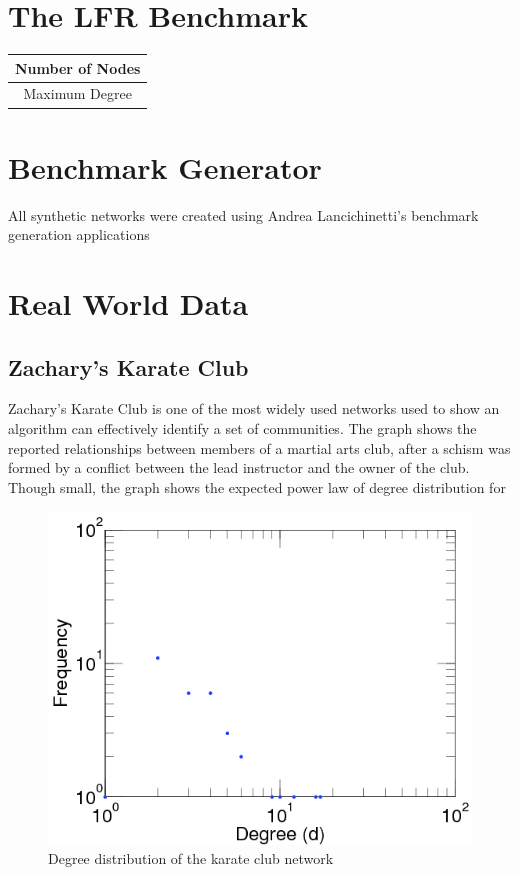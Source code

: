 \section{The LFR Benchmark}



\begin{tabular}{|c|}
	\hline 
	Number of Nodes \\ 
	\hline 
	Maximum Degree \\ 
	\hline 
\end{tabular} 

\cite{Lancichinetti2008}


\section{Benchmark Generator}
All synthetic networks were created using Andrea Lancichinetti's benchmark generation applications 

\section{Real World Data}
\subsection{Zachary's Karate Club}
Zachary's Karate Club \cite{Zachary1977} is one of the most widely used networks used to show an algorithm can effectively identify a set of communities. The graph shows the reported relationships between members of a martial arts club, after a schism was formed by a conflict between the lead instructor and the owner of the club. Though small, the graph shows the expected power law of degree distribution for 

\begin{figure}[!htb]
	\begin{center}
		\includegraphics[scale=.5]{images/zachary_degree_dist.png}
	\end{center}
	\caption{Degree distribution of the karate club network\cite{Kunegis2013}}
	\label{logo}
\end{figure}

